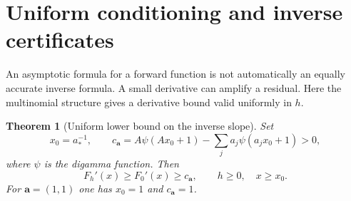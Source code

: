\documentclass[11pt,a4paper]{article}
\numberwithin{equation}{section}
\newtheorem{theorem}{Theorem}[section]
\theoremstyle{definition}\newtheorem{definition}[theorem]{Definition}
\theoremstyle{remark}\newtheorem{remark}[theorem]{Remark}
\newcommand{\avec}{\boldsymbol a}
\newcommand{\amin}{a_*}
\begin{document}
\section{Uniform conditioning and inverse certificates}
\label{sec:inverse}

An asymptotic formula for a forward function is not automatically an equally
accurate inverse formula. A small derivative can amplify a residual. Here the
multinomial structure gives a derivative bound valid uniformly in $h$.

\begin{theorem}[Uniform lower bound on the inverse slope]
\label{thm:slope}
Set
\begin{equation}
 x_0=\amin^{-1},\qquad
 c_{\avec}=A\psi(Ax_0+1)-\sum_j a_j\psi(a_jx_0+1)>0,
 \label{eq:c}
\end{equation}
where $\psi$ is the digamma function. Then
\begin{equation}
 F_h'(x)\ge F_0'(x)\ge c_{\avec},
 \qquad h\ge0,\quad x\ge x_0.
 \label{eq:slope}
\end{equation}
For $\avec=(1,1)$ one has $x_0=1$ and $c_{\avec}=1$.
\end{theorem}
\end{document}
